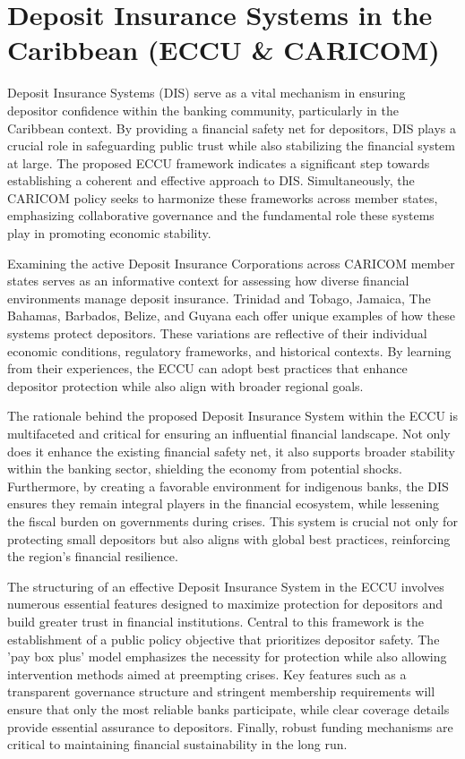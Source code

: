 \section{Deposit Insurance Systems in the Caribbean (ECCU \& CARICOM)}

Deposit Insurance Systems (DIS) serve as a vital mechanism in ensuring depositor confidence within the banking community, particularly in the Caribbean context. By providing a financial safety net for depositors, DIS plays a crucial role in safeguarding public trust while also stabilizing the financial system at large. The proposed ECCU framework indicates a significant step towards establishing a coherent and effective approach to DIS. Simultaneously, the CARICOM policy seeks to harmonize these frameworks across member states, emphasizing collaborative governance and the fundamental role these systems play in promoting economic stability.

Examining the active Deposit Insurance Corporations across CARICOM member states serves as an informative context for assessing how diverse financial environments manage deposit insurance. Trinidad and Tobago, Jamaica, The Bahamas, Barbados, Belize, and Guyana each offer unique examples of how these systems protect depositors. These variations are reflective of their individual economic conditions, regulatory frameworks, and historical contexts. By learning from their experiences, the ECCU can adopt best practices that enhance depositor protection while also align with broader regional goals.

The rationale behind the proposed Deposit Insurance System within the ECCU is multifaceted and critical for ensuring an influential financial landscape. Not only does it enhance the existing financial safety net, it also supports broader stability within the banking sector, shielding the economy from potential shocks. Furthermore, by creating a favorable environment for indigenous banks, the DIS ensures they remain integral players in the financial ecosystem, while lessening the fiscal burden on governments during crises. This system is crucial not only for protecting small depositors but also aligns with global best practices, reinforcing the region's financial resilience.

The structuring of an effective Deposit Insurance System in the ECCU involves numerous essential features designed to maximize protection for depositors and build greater trust in financial institutions. Central to this framework is the establishment of a public policy objective that prioritizes depositor safety. The 'pay box plus' model emphasizes the necessity for protection while also allowing intervention methods aimed at preempting crises. Key features such as a transparent governance structure and stringent membership requirements will ensure that only the most reliable banks participate, while clear coverage details provide essential assurance to depositors. Finally, robust funding mechanisms are critical to maintaining financial sustainability in the long run.

